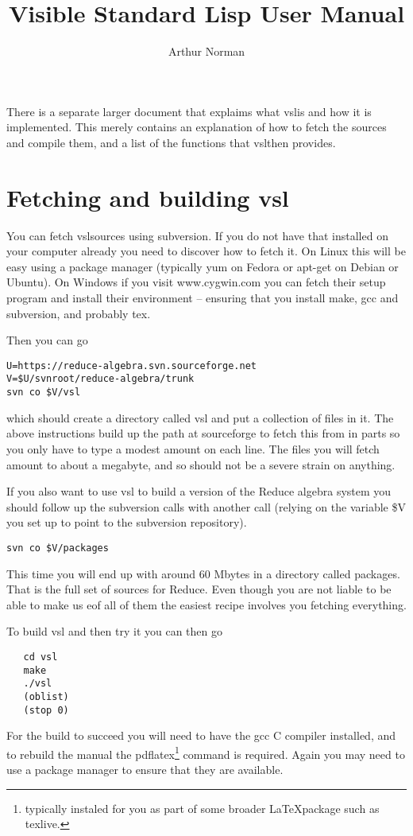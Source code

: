 \documentclass[a4paper,12pt]{article}
\title{Visible Standard Lisp User Manual}
\author{Arthur Norman}
\newcommand{\vsl}{{\ttfamily vsl}}
\newcommand{\tx}{\ttfamily}
\newcommand{\sverb}{\small\begin{verbatim}}
\begin{document}
\maketitle


There is a separate larger document that explaims what \vsl is
and how it is implemented. This merely contains an explanation of how
to fetch the sources and compile them, and a list of the functions
that \vsl then provides.


\section{Fetching and building vsl}
You can fetch \vsl sources using {\tx subversion}. If you do not have that
installed on your computer already you need to discover how to fetch it.
On Linux this will be easy using a package manager (typically {\tx yum}
on Fedora or {\tx apt-get} on Debian or Ubuntu). On Windows if you visit
{\tx www.cygwin.com} you can fetch their setup program and install their
environment -- ensuring that you install {\tx make}, {\tx gcc} and
{\tx subversion}, and probably {\tx tex}.

Then you can go
{\sverb
U=https://reduce-algebra.svn.sourceforge.net
V=$U/svnroot/reduce-algebra/trunk
svn co $V/vsl
\end{verbatim}}
which should create a directory called {\tx vsl} and put a collection of
files in it. The above instructions build up the path at {\tx sourceforge}
to fetch this from in parts so you only have to type a modest
amount on each line. The files you will fetch amount to about a megabyte,
and so should not be a severe strain on anything.

If you also want to use \vsl{} to build a version of the Reduce algebra
system you should follow up the subversion calls with another call (relying
on the variable {\tx \$V} you set up to point to the subversion repository).
{\sverb
svn co $V/packages
\end{verbatim}}
This time you will end up with around 60 Mbytes in a directory called
{\tx packages}. That is the full set of sources for Reduce. Even though you
are not liable to be able to make us eof all of them the easiest recipe
involves you fetching everything.

To build \vsl{} and then try it you can then go
{\sverb
   cd vsl
   make
   ./vsl
   (oblist)
   (stop 0)
\end{verbatim}}

For the build to succeed you will need to have the {\tx gcc} C compiler
installed, and to rebuild the manual the {\tx pdflatex}\footnote{typically
instaled for you as part of some broader \LaTeX package such as texlive.}
command is required. Again you may need to use a package manager to ensure
that they are available.
\end{document}
